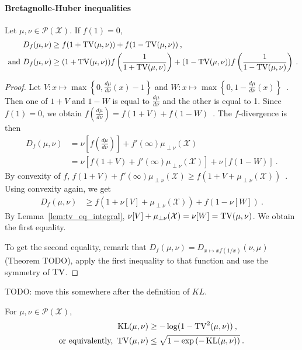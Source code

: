 \paragraph{Bretagnolle-Huber inequalities}

\begin{theorem}
  \label{thm:bh_fDiv}
  Let $\mu, \nu \in \mathcal P(\mathcal X)$. If $f(1) = 0$,
  \begin{align*}
  D_f(\mu, \nu)
  &\ge f(1 + \operatorname{TV}(\mu, \nu)) + f(1 - \operatorname{TV}(\mu, \nu))
  \: , \\
  \text{ and }
  D_f(\mu, \nu)
  &\ge (1 + \operatorname{TV}(\mu, \nu))f\left(\frac{1}{1 + \operatorname{TV}(\mu, \nu)}\right) + (1 - \operatorname{TV}(\mu, \nu))f\left(\frac{1}{1 - \operatorname{TV}(\mu, \nu)}\right)
  \: .
  \end{align*}
\end{theorem}

\begin{proof}%
{}
Let $V: x \mapsto \max\left\{0, \frac{d\mu}{d\nu}(x) - 1\right\}$ and $W: x \mapsto \max\left\{0, 1 - \frac{d\mu}{d\nu}(x)\right\}$~.
Then one of $1+V$ and $1-W$ is equal to $\frac{d\mu}{d\nu}$ and the other is equal to 1.
Since $f(1) = 0$, we obtain $f(\frac{d\mu}{d\nu}) = f(1+V) + f(1-W)$~.
The $f$-divergence is then
\begin{align*}
D_f(\mu, \nu)
&= \nu[f(\frac{d\mu}{d\nu})] + f'(\infty)\mu_{\perp \nu}(\mathcal X)
\\
&= \nu\left[f(1+V) + f'(\infty)\mu_{\perp \nu}(\mathcal X)\right] + \nu\left[f(1 - W)\right]
\: .
\end{align*}
By convexity of $f$, $f(1+V) + f'(\infty)\mu_{\perp \nu}(\mathcal X) \ge f(1+V + \mu_{\perp \nu}(\mathcal X))$~. Using convexity again, we get
\begin{align*}
D_f(\mu, \nu)
&\ge f(1+ \nu[V] + \mu_{\perp \nu}(\mathcal X)) + f(1 - \nu[W])
\: .
\end{align*}
By Lemma~\ref{lem:tv_eq_integral}, $\nu[V] + \mu_{\perp \nu}(\mathcal X) = \nu[W] = \operatorname{TV}(\mu, \nu)$. We obtain the first equality.

To get the second equality, remark that $D_f(\mu, \nu) = D_{x\mapsto xf(1/x)}(\nu, \mu)$ (Theorem TODO), apply the first inequality to that function and use the symmetry of $\operatorname{TV}$.
\end{proof}

\begin{corollary}
  \label{cor:bh_kl}
  TODO: move this somewhere after the definition of $KL$.

  For $\mu, \nu \in \mathcal P(\mathcal X)$,
  \begin{align*}
  \operatorname{KL}(\mu, \nu)
  &\ge - \log(1 - \operatorname{TV}^2(\mu, \nu))
  \: , \\
  \text{or equivalently, }
  \operatorname{TV}(\mu, \nu)
  &\le \sqrt{1 - \exp\left(-\operatorname{KL}(\mu, \nu) \right)}
  \: .
  \end{align*}
\end{corollary}

